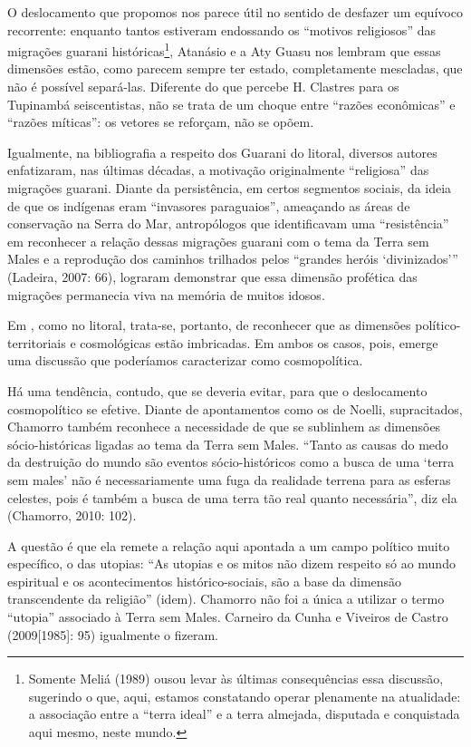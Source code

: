 O deslocamento que propomos nos parece útil no sentido de desfazer um
equívoco recorrente: enquanto tantos estiveram endossando os ``motivos
religiosos'' das migrações guarani históricas\footnote{Somente Meliá
(1989) ousou levar às últimas consequências essa discussão, sugerindo o
que, aqui, estamos constatando operar plenamente na atualidade: a
associação entre a ``terra ideal'' e a terra almejada, disputada e
conquistada aqui mesmo, neste mundo.}, Atanásio e a Aty Guasu nos
lembram que essas dimensões estão, como parecem sempre ter estado,
completamente mescladas, que não é possível separá-las. Diferente do
que percebe H. Clastres para os Tupinambá seiscentistas, não se trata
de um choque entre ``razões econômicas'' e ``razões míticas'': os vetores
se reforçam, não se opõem.

Igualmente, na bibliografia a respeito dos Guarani do litoral, diversos
autores enfatizaram, nas últimas décadas, a motivação originalmente
``religiosa'' das migrações guarani. Diante da persistência, em certos
segmentos sociais, da ideia de que os indígenas eram ``invasores
paraguaios'', ameaçando as áreas de conservação na Serra do Mar,
antropólogos que identificavam uma ``resistência'' em reconhecer a
relação dessas migrações guarani com o tema da Terra sem Males e a
reprodução dos caminhos trilhados pelos ``grandes heróis ‘divinizados’''
(Ladeira, 2007: 66), lograram demonstrar que essa dimensão profética
das migrações permanecia viva na memória de muitos idosos. 

Em , como no litoral, trata-se, portanto, de reconhecer que as
dimensões político- territoriais e cosmológicas estão imbricadas. Em
ambos os casos, pois, emerge uma discussão que poderíamos caracterizar
como cosmopolítica.

Há uma tendência, contudo, que se deveria evitar, para que o
deslocamento cosmopolítico se efetive. Diante de apontamentos como os
de Noelli, supracitados, Chamorro também reconhece a necessidade de que
se sublinhem as dimensões sócio-históricas ligadas ao tema da Terra sem
Males. ``Tanto as causas do medo da destruição do mundo são eventos
sócio-históricos como a busca de uma ‘terra sem males’ não é
necessariamente uma fuga da realidade terrena para as esferas celestes,
pois é também a busca de uma terra tão real quanto necessária'', diz ela
(Chamorro, 2010: 102). 

A questão é que ela remete a relação aqui apontada a um campo político
muito específico, o das utopias: ``As utopias e os mitos não dizem
respeito só ao mundo espiritual e os acontecimentos histórico-sociais,
são a base da dimensão transcendente da religião'' (idem). Chamorro não
foi a única a utilizar o termo ``utopia'' associado à Terra sem Males.
Carneiro da Cunha e Viveiros de Castro (2009[1985]: 95) igualmente o
fizeram. 


